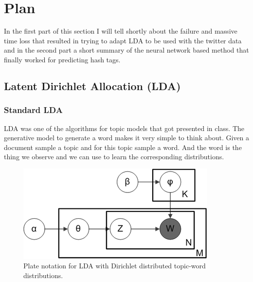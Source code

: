 \documentclass[10pt,conference,compsocconf]{IEEEtran}
\begin{document}
\section{Plan}
\label{sec:Plan}
In the first part of this section I will tell shortly about the failure and massive time loss that resulted in trying to adapt LDA to be used with the twitter data and in the second part a short summary of the neural network based method that finally worked for predicting hash tags. 
\subsection{Latent Dirichlet Allocation (LDA)}
\subsubsection{Standard LDA}
LDA was one of the algorithms for topic models that got presented in class. The generative model to generate a word makes it very simple to think about. Given a document sample a topic and for this topic sample a word. And the word is the thing we observe and we can use to learn the corresponding distributions. 
\begin{figure}
	\centering
	\includegraphics[width=0.7\linewidth]{images/lda_plate}
	\caption{Plate notation for LDA with Dirichlet distributed topic-word distributions.}
	\label{fig:ldaplate}
\end{figure}
\end{document}
